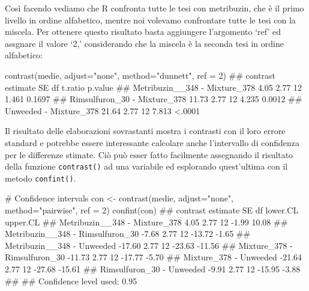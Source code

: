 \documentclass[a4paper,12pt,oneside]{book}
\newenvironment{Shaded}{\begin{snugshade}}{\end{snugshade}}
\newcommand{\DecValTok}[1]{#1}
\newcommand{\StringTok}[1]{#1}
\newcommand{\CommentTok}[1]{#1}
\newcommand{\DocumentationTok}[1]{#1}
\newcommand{\OtherTok}[1]{#1}
\newcommand{\FunctionTok}[1]{#1}
\newcommand{\AttributeTok}[1]{#1}
\newcommand{\NormalTok}[1]{#1}
\begin{document}
\normalsize

Così facendo vediamo che R confronta tutte le tesi con metribuzin, che è il primo livello in ordine alfabetico, mentre noi volevamo confrontare tutte le tesi con la miscela. Per ottenere questo risultato basta aggiungere l'argomento `ref' ed assgnare il valore `2,' considerando che la miscela è la seconda tesi in ordine alfabetico:

\small

\begin{Shaded}
\begin{Highlighting}[]
\FunctionTok{contrast}\NormalTok{(medie, }\AttributeTok{adjust=}\StringTok{"none"}\NormalTok{, }\AttributeTok{method=}\StringTok{"dunnett"}\NormalTok{, }\AttributeTok{ref =} \DecValTok{2}\NormalTok{)}
\DocumentationTok{\#\#  contrast                      estimate   SE df t.ratio p.value}
\DocumentationTok{\#\#  Metribuzin\_\_348 {-} Mixture\_378     4.05 2.77 12   1.461  0.1697}
\DocumentationTok{\#\#  Rimsulfuron\_30 {-} Mixture\_378     11.73 2.77 12   4.235  0.0012}
\DocumentationTok{\#\#  Unweeded {-} Mixture\_378           21.64 2.77 12   7.813  \textless{}.0001}
\end{Highlighting}
\end{Shaded}

\normalsize

Il risultato delle elaborazioni sovrastanti mostra i contrasti con il loro errore standard e potrebbe essere interessante calcolare anche l'intervallo di confidenza per le differenze stimate. Ciò può esser fatto facilmente assegnando il risultato della funzione \texttt{contrast()} ad una variabile ed esplorando quest'ultima con il metodo \texttt{confint()}.

\small

\begin{Shaded}
\begin{Highlighting}[]
\CommentTok{\# Confidence intervals}
\NormalTok{con }\OtherTok{\textless{}{-}} \FunctionTok{contrast}\NormalTok{(medie, }\AttributeTok{adjust=}\StringTok{"none"}\NormalTok{, }
                \AttributeTok{method=}\StringTok{"pairwise"}\NormalTok{, }\AttributeTok{ref =} \DecValTok{2}\NormalTok{)}
\FunctionTok{confint}\NormalTok{(con)}
\DocumentationTok{\#\#  contrast                         estimate   SE df lower.CL upper.CL}
\DocumentationTok{\#\#  Metribuzin\_\_348 {-} Mixture\_378        4.05 2.77 12    {-}1.99    10.08}
\DocumentationTok{\#\#  Metribuzin\_\_348 {-} Rimsulfuron\_30    {-}7.68 2.77 12   {-}13.72    {-}1.65}
\DocumentationTok{\#\#  Metribuzin\_\_348 {-} Unweeded         {-}17.60 2.77 12   {-}23.63   {-}11.56}
\DocumentationTok{\#\#  Mixture\_378 {-} Rimsulfuron\_30       {-}11.73 2.77 12   {-}17.77    {-}5.70}
\DocumentationTok{\#\#  Mixture\_378 {-} Unweeded             {-}21.64 2.77 12   {-}27.68   {-}15.61}
\DocumentationTok{\#\#  Rimsulfuron\_30 {-} Unweeded           {-}9.91 2.77 12   {-}15.95    {-}3.88}
\DocumentationTok{\#\# }
\DocumentationTok{\#\# Confidence level used: 0.95}
\end{Highlighting}
\end{Shaded}
\end{document}
